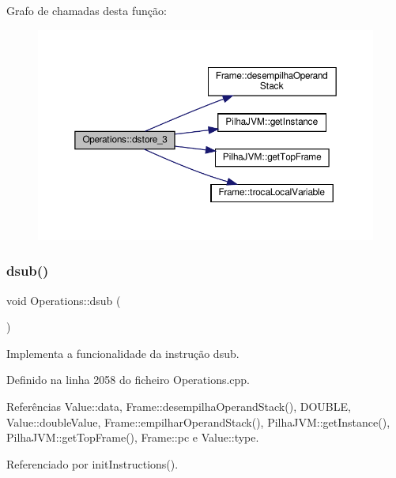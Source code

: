 Grafo de chamadas desta função\+:
\nopagebreak
\begin{figure}[H]
\begin{center}
\leavevmode
\includegraphics[width=350pt]{classOperations_a161cba32105238617b0cfd5c47afdfe4_cgraph}
\end{center}
\end{figure}
\mbox{\label{classOperations_aa994b0cf4aead2646fa5bb90c2643664}} 
\subsubsection{\texorpdfstring{dsub()}{dsub()}}
{\footnotesize\ttfamily void Operations\+::dsub (\begin{DoxyParamCaption}{ }\end{DoxyParamCaption})\hspace{0.3cm}{\ttfamily [private]}}



Implementa a funcionalidade da instrução dsub. 



Definido na linha 2058 do ficheiro Operations.\+cpp.



Referências Value\+::data, Frame\+::desempilha\+Operand\+Stack(), D\+O\+U\+B\+LE, Value\+::double\+Value, Frame\+::empilhar\+Operand\+Stack(), Pilha\+J\+V\+M\+::get\+Instance(), Pilha\+J\+V\+M\+::get\+Top\+Frame(), Frame\+::pc e Value\+::type.



Referenciado por init\+Instructions().

